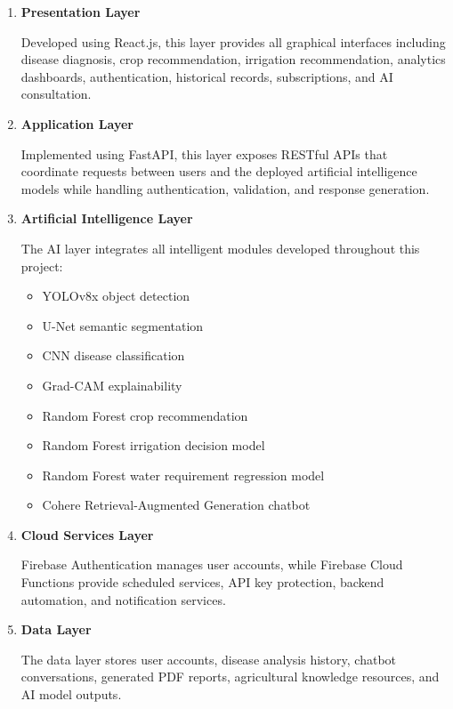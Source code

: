 \begin{enumerate}[leftmargin=*,label=\textbf{Layer \arabic*.}]

\item \textbf{Presentation Layer}

Developed using React.js, this layer provides all graphical interfaces including disease diagnosis, crop recommendation, irrigation recommendation, analytics dashboards, authentication, historical records, subscriptions, and AI consultation.

\item \textbf{Application Layer}

Implemented using FastAPI, this layer exposes RESTful APIs that coordinate requests between users and the deployed artificial intelligence models while handling authentication, validation, and response generation.

\item \textbf{Artificial Intelligence Layer}

The AI layer integrates all intelligent modules developed throughout this project:

\begin{itemize}[leftmargin=*]
\item YOLOv8x object detection
\item U-Net semantic segmentation
\item CNN disease classification
\item Grad-CAM explainability
\item Random Forest crop recommendation
\item Random Forest irrigation decision model
\item Random Forest water requirement regression model
\item Cohere Retrieval-Augmented Generation chatbot
\end{itemize}

\item \textbf{Cloud Services Layer}

Firebase Authentication manages user accounts, while Firebase Cloud Functions provide scheduled services, API key protection, backend automation, and notification services.

\item \textbf{Data Layer}

The data layer stores user accounts, disease analysis history, chatbot conversations, generated PDF reports, agricultural knowledge resources, and AI model outputs.

\end{enumerate}

